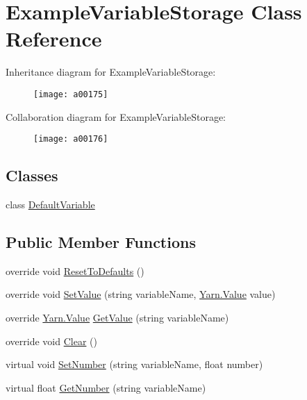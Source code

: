 \hypertarget{a00033}{\section{Example\-Variable\-Storage Class Reference}
\label{a00033}
}


Inheritance diagram for Example\-Variable\-Storage\-:
\nopagebreak
\begin{figure}[H]
\begin{center}
\leavevmode
\texttt{[image: a00175]}
\end{center}
\end{figure}


Collaboration diagram for Example\-Variable\-Storage\-:
\nopagebreak
\begin{figure}[H]
\begin{center}
\leavevmode
\texttt{[image: a00176]}
\end{center}
\end{figure}
\subsection*{Classes}
\begin{DoxyCompactItemize}
\item 
class \hyperlink{a00033_a00158}{Default\-Variable}
\end{DoxyCompactItemize}
\subsection*{Public Member Functions}
\begin{DoxyCompactItemize}
\item 
override void \hyperlink{a00033_a3a05d66cdacadb2e9b618cd0aef45f84}{Reset\-To\-Defaults} ()
\item 
override void \hyperlink{a00033_ac4265c1c9da485f13a6b05784b0f668d}{Set\-Value} (string variable\-Name, \hyperlink{a00086}{Yarn.\-Value} value)
\item 
override \hyperlink{a00086}{Yarn.\-Value} \hyperlink{a00033_a741593be1a299dcc2136f05b9b4a995a}{Get\-Value} (string variable\-Name)
\item 
override void \hyperlink{a00033_a0ce614bee8d5b220500fb765390b4ca3}{Clear} ()
\item 
virtual void \hyperlink{a00089_ac0d2f2e081944ad197992a26ad1a833c}{Set\-Number} (string variable\-Name, float number)
\item 
virtual float \hyperlink{a00089_add85a45dd65a5d4bd41c9d5ce5f77d19}{Get\-Number} (string variable\-Name)
\end{DoxyCompactItemize}
